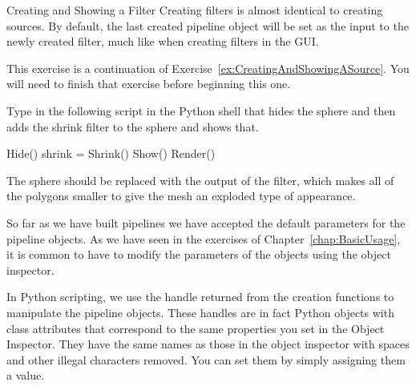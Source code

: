\begin{exercise}{Creating and Showing a Filter}
  \label{ex:CreatingAndShowingAFilter}%
  Creating filters is almost identical to creating sources.  By default,
  the last created pipeline object will be set as the input to the newly
  created filter, much like when creating filters in the GUI.

  This exercise is a continuation of
  Exercise~\ref{ex:CreatingAndShowingASource}.  You will need to finish
  that exercise before beginning this one.

  Type in the following script in the Python shell that hides the sphere
  and then adds the shrink filter to the sphere and shows that.

  \begin{python}
Hide()
shrink = Shrink()
Show()
Render()
  \end{python}

  The sphere should be replaced with the output of the 
  filter, which makes all of the polygons smaller to give the mesh an
  exploded type of appearance.
\end{exercise}

So far as we have built pipelines we have accepted the default parameters
for the pipeline objects.  As we have seen in the exercises of
Chapter~\ref{chap:BasicUsage}, it is common to have to modify the
parameters of the objects using the object inspector.

In Python scripting, we use the handle returned from the creation functions
to manipulate the pipeline objects.  These handles are in fact Python
objects with class attributes that correspond to the same properties you
set in the Object Inspector.  They have the same names as those in the
object inspector with spaces and other illegal characters removed.  You can
set them by simply assigning them a value.

